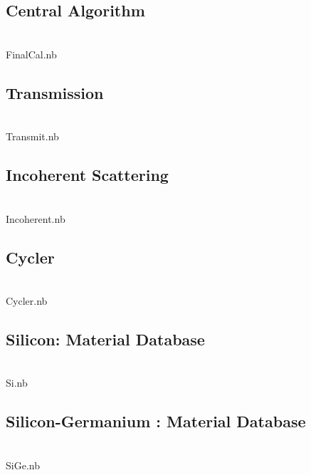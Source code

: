 \begin{figure}[h]
\subsection{Central Algorithm}
\\FinalCal.nb
\end{figure}

\begin{figure}[h]
\subsection{Transmission}
\\Transmit.nb
\end{figure}

\begin{figure}[h]
\subsection{Incoherent Scattering}
\\Incoherent.nb
\end{figure}

\begin{figure}[h]
\subsection{Cycler}
\\Cycler.nb
\end{figure}
 
\begin{figure}[h]
\subsection{Silicon: Material Database}
\\Si.nb
\end{figure}

\begin{figure}[h]
\subsection{Silicon-Germanium : Material Database}
\\SiGe.nb
\end{figure}

